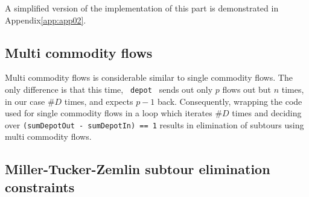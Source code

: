 A simplified version of the implementation of this part is demonstrated in
Appendix\ref{app:app02}.

\subsection{Multi commodity flows}


Multi commodity flows is considerable similar to single commodity flows. The
only difference is that this time, \texttt{ depot } sends out only $p$ flows out
but $n$ times, in our case $\#D$ times, and expects $p-1$ back. Consequently,
wrapping the code used for single commodity flows in a loop which iterates $\#D$
times and deciding over \texttt{(sumDepotOut - sumDepotIn) == 1} results in
elimination of subtours using multi commodity flows.

\subsection{Miller-Tucker-Zemlin subtour elimination constraints}

